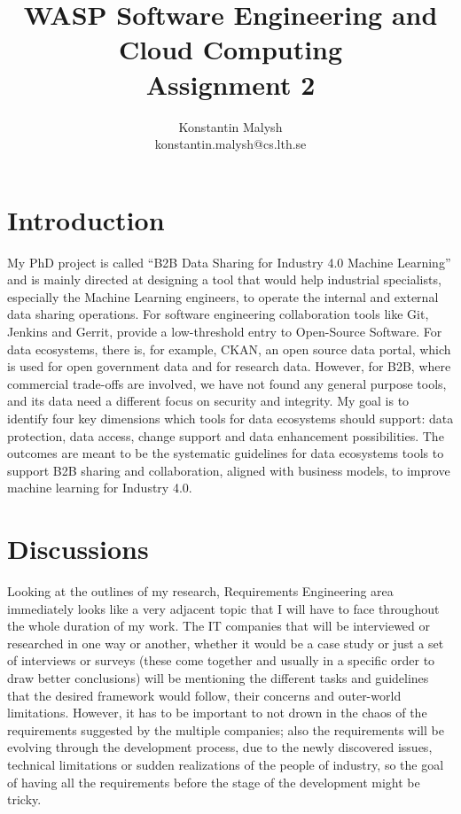 \documentclass{article}
\title{WASP Software Engineering and Cloud Computing\\Assignment 2}
\author{Konstantin Malysh\\konstantin.malysh@cs.lth.se}
\begin{document}
\maketitle

\section{Introduction}

My PhD project is called “B2B Data Sharing for Industry 4.0 Machine Learning” and is mainly directed at designing a tool that would help industrial specialists, especially the Machine Learning engineers, to operate the internal and external data sharing operations. For software engineering collaboration tools like Git, Jenkins and Gerrit, provide a low-threshold entry to Open-Source Software. For data ecosystems, there is, for example, CKAN, an open source data portal, which is used for open government data and for research data. However, for B2B, where commercial trade-offs are involved, we have not found any general purpose tools, and its data need a different focus on security and integrity.
My goal is to identify four key dimensions which tools for data ecosystems should support: data protection, data access, change support and data enhancement possibilities.
The outcomes are meant to be the systematic guidelines for data ecosystems tools to support B2B sharing and collaboration, aligned with business models, to improve machine learning for Industry 4.0.

\section{Discussions}

Looking at the outlines of my research, Requirements Engineering area immediately looks like a very adjacent topic that I will have to face throughout the whole duration of my work. The IT companies that will be interviewed or researched in one way or another, whether it would be a case study or just a set of interviews or surveys (these come together and usually in a specific order to draw better conclusions) will be mentioning the different tasks and guidelines that the desired framework would follow, their concerns and outer-world limitations. However, it has to be important to not drown in the chaos of the requirements suggested by the multiple companies; also the requirements will be evolving through the development process, due to the newly discovered issues, technical limitations or sudden realizations of the people of industry, so the goal of having all the requirements before the stage of the development might be tricky.
\end{document}
